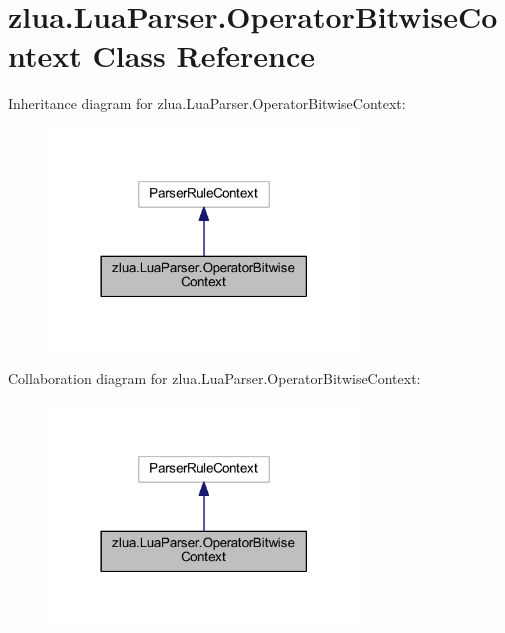 \hypertarget{classzlua_1_1_lua_parser_1_1_operator_bitwise_context}{}\section{zlua.\+Lua\+Parser.\+Operator\+Bitwise\+Context Class Reference}
\label{classzlua_1_1_lua_parser_1_1_operator_bitwise_context}


Inheritance diagram for zlua.\+Lua\+Parser.\+Operator\+Bitwise\+Context\+:
\nopagebreak
\begin{figure}[H]
\begin{center}
\leavevmode
\includegraphics[width=234pt]{classzlua_1_1_lua_parser_1_1_operator_bitwise_context__inherit__graph}
\end{center}
\end{figure}


Collaboration diagram for zlua.\+Lua\+Parser.\+Operator\+Bitwise\+Context\+:
\nopagebreak
\begin{figure}[H]
\begin{center}
\leavevmode
\includegraphics[width=234pt]{classzlua_1_1_lua_parser_1_1_operator_bitwise_context__coll__graph}
\end{center}
\end{figure}
